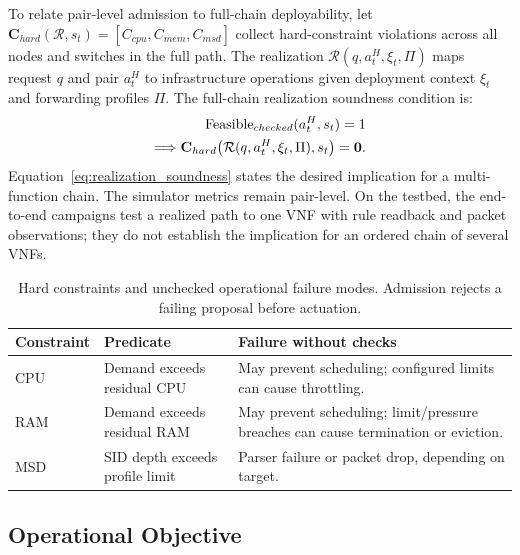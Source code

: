 \documentclass[final,5p]{elsarticle}
\newcommand{\rev}[1]{\textcolor{revisiongreen}{#1}}
\let\newrev\rev
\begin{document}
\rev{To relate pair-level admission to full-chain deployability, let $\mathbf{C}_{hard}(\mathcal{R},s_t)=[C_{cpu},C_{mem},C_{msd}]$ collect hard-constraint violations across all nodes and switches in the full path. The realization $\mathcal{R}(q,a_t^H,\xi_t,\Pi)$ maps request $q$ and pair $a_t^H$ to infrastructure operations given deployment context $\xi_t$ and forwarding profiles $\Pi$. The full-chain realization soundness condition is:}
\begin{equation}
    \rev{\begin{aligned}
\mathrm{Feasible}_{checked}(a_t^H,s_t)=1\\
\Longrightarrow\mathbf{C}_{hard}\!\left(\mathcal{R}(q,a_t^H,\xi_t,\Pi),s_t\right)=\mathbf{0}.
\end{aligned}}
\label{eq:realization_soundness}
\end{equation}
\rev{Equation~\eqref{eq:realization_soundness} states the desired implication for a multi-function chain. The simulator metrics remain pair-level. On the testbed, the end-to-end campaigns test a realized path to one VNF with rule readback and packet observations; they do not establish the implication for an ordered chain of several VNFs.}

\begin{table}[t]
\centering
\caption{\newrev{Hard constraints and unchecked operational failure modes. Admission rejects a failing proposal before actuation.}}
\label{tab:hard_constraint_failure_mapping}
{\color{revisiongreen}\footnotesize
\setlength{\tabcolsep}{3pt}
\begin{tabularx}{\columnwidth}{@{}lXX@{}}
\toprule
Constraint & Predicate & Failure without checks \\
\midrule
CPU & Demand exceeds residual CPU & May prevent scheduling; configured limits can cause throttling. \\
RAM & Demand exceeds residual RAM & May prevent scheduling; limit/pressure breaches can cause termination or eviction. \\
MSD & SID depth exceeds profile limit & Parser failure or packet drop, depending on target. \\
\bottomrule
\end{tabularx}}
\end{table}

\subsection{Operational Objective}
\label{subsec:objective_metrics}
\end{document}
